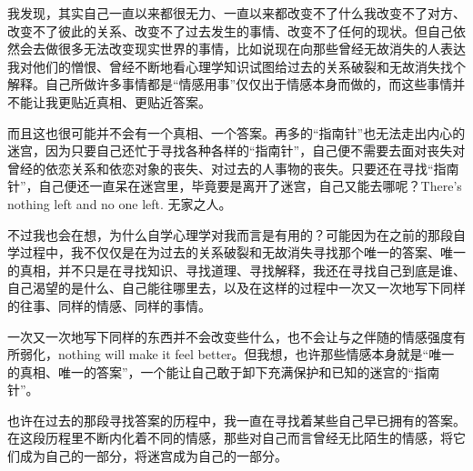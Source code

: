 我发现，其实自己一直以来都很无力、一直以来都改变不了什么\pozhehao{}我改变不了对方、改变不了彼此的关系、改变不了过去发生的事情、改变不了任何的现状。但自己依然会去做很多无法改变现实世界的事情，比如说现在向那些曾经无故消失的人表达我对他们的憎恨、曾经不断地看心理学知识试图给过去的关系破裂和无故消失找个解释。自己所做许多事情都是“情感用事”\pozhehao{}仅仅出于情感本身而做的，而这些事情并不能让我更贴近真相、更贴近答案。

而且这也很可能并不会有一个真相、一个答案。再多的“指南针”也无法走出内心的迷宫，因为只要自己还忙于寻找各种各样的“指南针”，自己便不需要去面对丧失\pozhehao{}对曾经的依恋关系和依恋对象的丧失、对过去的人事物的丧失。只要还在寻找“指南针”，自己便还一直呆在迷宫里，毕竟要是离开了迷宫，自己又能去哪呢？There's nothing left and no one left. 无家之人。

不过我也会在想，为什么自学心理学对我而言是有用的？可能因为在之前的那段自学过程中，我不仅仅是在为过去的关系破裂和无故消失寻找那个唯一的答案、唯一的真相，并不只是在寻找知识、寻找道理、寻找解释，我还在寻找自己到底是谁、自己渴望的是什么、自己能往哪里去，以及在这样的过程中一次又一次地写下同样的往事、同样的情感、同样的事情。

一次又一次地写下同样的东西并不会改变些什么，也不会让与之伴随的情感强度有所弱化，nothing will make it feel better。但我想，也许那些情感本身就是“唯一的真相、唯一的答案”，一个能让自己敢于卸下充满保护和已知的迷宫的“指南针”。

也许在过去的那段寻找答案的历程中，我一直在寻找着某些自己早已拥有的答案。在这段历程里不断内化着不同的情感，那些对自己而言曾经无比陌生的情感，将它们成为自己的一部分，将迷宫成为自己的一部分。
